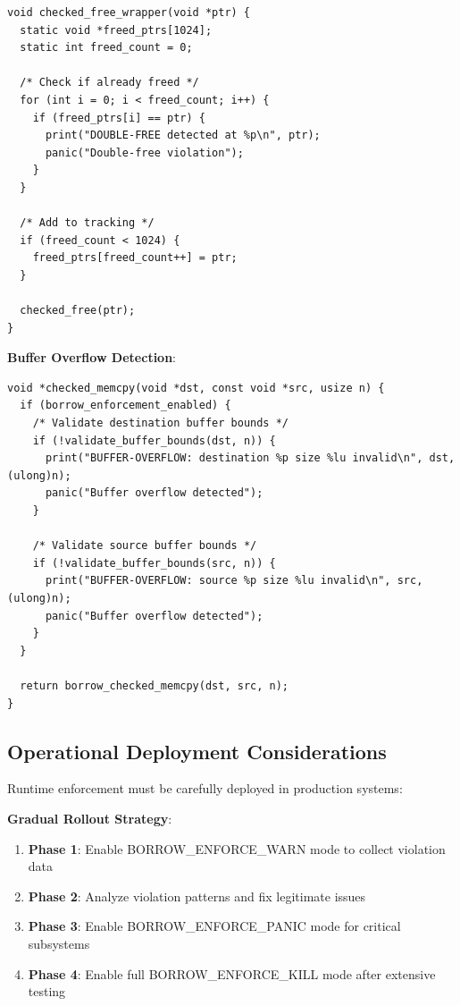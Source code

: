 \documentclass[11pt,letterpaper]{article}
\begin{document}
\begin{lstlisting}
void checked_free_wrapper(void *ptr) {
  static void *freed_ptrs[1024];
  static int freed_count = 0;
  
  /* Check if already freed */
  for (int i = 0; i < freed_count; i++) {
    if (freed_ptrs[i] == ptr) {
      print("DOUBLE-FREE detected at %p\n", ptr);
      panic("Double-free violation");
    }
  }
  
  /* Add to tracking */
  if (freed_count < 1024) {
    freed_ptrs[freed_count++] = ptr;
  }
  
  checked_free(ptr);
}
\end{lstlisting}

\textbf{Buffer Overflow Detection}:

\begin{lstlisting}
void *checked_memcpy(void *dst, const void *src, usize n) {
  if (borrow_enforcement_enabled) {
    /* Validate destination buffer bounds */
    if (!validate_buffer_bounds(dst, n)) {
      print("BUFFER-OVERFLOW: destination %p size %lu invalid\n", dst, (ulong)n);
      panic("Buffer overflow detected");
    }
    
    /* Validate source buffer bounds */
    if (!validate_buffer_bounds(src, n)) {
      print("BUFFER-OVERFLOW: source %p size %lu invalid\n", src, (ulong)n);
      panic("Buffer overflow detected");
    }
  }
  
  return borrow_checked_memcpy(dst, src, n);
}
\end{lstlisting}

\subsection{Operational Deployment Considerations}

Runtime enforcement must be carefully deployed in production systems:

\textbf{Gradual Rollout Strategy}:

\begin{enumerate}
\item \textbf{Phase 1}: Enable BORROW\_ENFORCE\_WARN mode to collect violation data
\item \textbf{Phase 2}: Analyze violation patterns and fix legitimate issues
\item \textbf{Phase 3}: Enable BORROW\_ENFORCE\_PANIC mode for critical subsystems
\item \textbf{Phase 4}: Enable full BORROW\_ENFORCE\_KILL mode after extensive testing
\end{enumerate}
\end{document}

